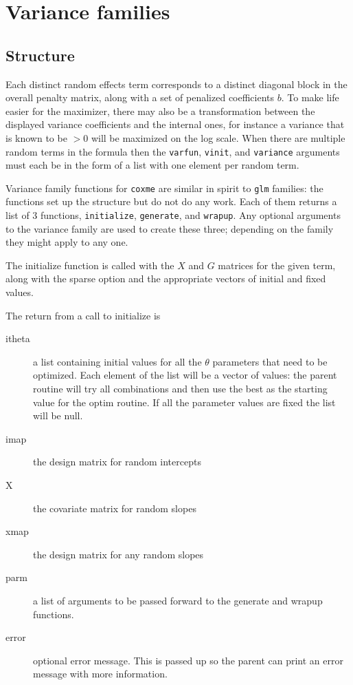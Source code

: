 \documentclass{article}
\begin{document}
    
\section{Variance families}
\subsection{Structure}
Each distinct random effects term corresponds to a distinct
diagonal block in the overall penalty matrix, along with a
set of penalized coefficients $b$.
To make life easier for the maximizer, there may also
be a transformation between the displayed variance 
coefficients and the internal ones, for instance a variance that is
known to be $>0$ will be maximized on the log scale.
When there are multiple random terms in the formula then the
\Verb!varfun!, \Verb?vinit?, and \Verb+variance+ arguments must each be in
the form of a list with one element per random term. 

Variance family functions for \Verb!coxme! are similar in spirit to \Verb?glm?
families: the functions set up the structure but do not do any
work.  
Each of them returns a list of 3 functions, \Verb!initialize!, \Verb?generate?, and
\Verb!wrapup!.
Any optional arguments to the variance family are used to create these
three; depending on the family they might apply to any one.

The initialize function is called with the $X$ and $G$ matrices for the
given term, along with the sparse option and 
the appropriate vectors of initial and fixed values.

The return from a call to initialize is
\begin{description}
\item[itheta] a list containing initial values for all the $\theta$ parameters
  that need to be optimized.  Each element of the list will be a vector of
  values: the parent routine will try all combinations and then use the best as
  the starting value for the optim routine.  If all the parameter values are
  fixed the list will be null.
\item[imap] the design matrix for random intercepts
\item[X] the covariate matrix for random slopes
\item[xmap] the design matrix for any random slopes
\item[parm] a list of arguments to be passed forward to the 
generate and wrapup functions. 
\item[error] optional error message.  This is passed up so the parent
  can print an error message with more information.
\end{description}
\end{document}
